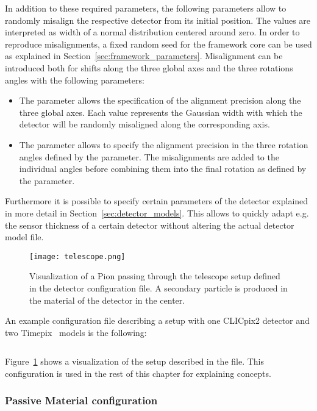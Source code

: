In addition to these required parameters, the following parameters allow to randomly misalign the respective detector from its initial position. The values are interpreted as width of a normal distribution centered around zero.
In order to reproduce misalignments, a fixed random seed for the framework core can be used as explained in Section~\ref{sec:framework_parameters}.
Misalignment can be introduced both for shifts along the three global axes and the three rotations angles with the following parameters:
\begin{itemize}
\item The parameter  allows the specification of the alignment precision along the three global axes. Each value represents the Gaussian width with which the detector will be randomly misaligned along the corresponding axis.
\item The parameter  allows to specify the alignment precision in the three rotation angles defined by the  parameter. The misalignments are added to the individual angles before combining them into the final rotation as defined by the  parameter.
\end{itemize}

Furthermore it is possible to specify certain parameters of the detector explained in more detail in Section~\ref{sec:detector_models}.
This allows to quickly adapt e.g. the sensor thickness of a certain detector without altering the actual detector model file.

\begin{figure}[t]
  \centering
  \texttt{[image: telescope.png]}
  \caption{Visualization of a Pion passing through the telescope setup defined in the detector configuration file. A secondary particle is produced in the material of the detector in the center.}
  \label{fig:telescope}
\end{figure}

An example configuration file describing a setup with one CLICpix2 detector and two Timepix~\cite{timepix} models is the following:
\inputminted[frame=single,framesep=3pt,breaklines=true,tabsize=2,linenos]{ini}{../../etc/manual_detector.conf}
Figure~\ref{fig:telescope} shows a visualization of the setup described in the file.
This configuration is used in the rest of this chapter for explaining concepts.

\subsubsection{Passive Material configuration}
\label{sec:passive_material_config}

